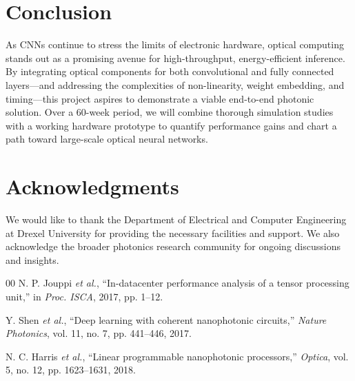 \documentclass[conference]{IEEEtran}
\begin{document}
\section{Conclusion}
As CNNs continue to stress the limits of electronic hardware, optical computing stands out as a promising avenue for high-throughput, energy-efficient inference. By integrating optical components for both convolutional and fully connected layers—and addressing the complexities of non-linearity, weight embedding, and timing—this project aspires to demonstrate a viable end-to-end photonic solution. Over a 60-week period, we will combine thorough simulation studies with a working hardware prototype to quantify performance gains and chart a path toward large-scale optical neural networks.

\section*{Acknowledgments}
We would like to thank the Department of Electrical and Computer Engineering at Drexel University for providing the necessary facilities and support. We also acknowledge the broader photonics research community for ongoing discussions and insights.


\begin{thebibliography}{00}
N. P. Jouppi \emph{et al.}, ``In-datacenter performance analysis of a tensor processing unit,'' in \textit{Proc. ISCA}, 2017, pp. 1--12.

Y. Shen \emph{et al.}, ``Deep learning with coherent nanophotonic circuits,'' \textit{Nature Photonics}, vol. 11, no. 7, pp. 441--446, 2017.

N. C. Harris \emph{et al.}, ``Linear programmable nanophotonic processors,'' \textit{Optica}, vol. 5, no. 12, pp. 1623--1631, 2018.
\end{thebibliography}
\end{document}
